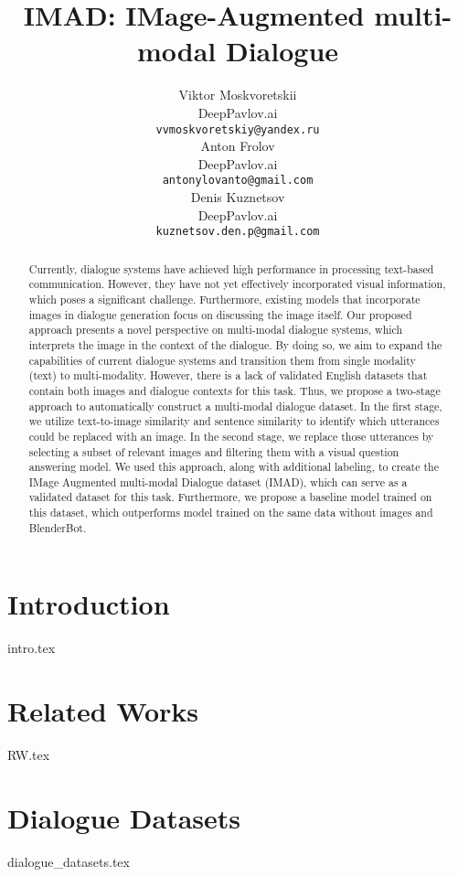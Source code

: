\documentclass{article}
\title{IMAD: IMage-Augmented multi-modal Dialogue
}
\author{
  Viktor Moskvoretskii \\
  DeepPavlov.ai \\
  \texttt{vvmoskvoretskiy@yandex.ru} \\
   \And
  Anton Frolov \\
  DeepPavlov.ai \\
  \texttt{antonylovanto@gmail.com} \\
  \And
  Denis Kuznetsov \\
  DeepPavlov.ai \\
  \texttt{kuznetsov.den.p@gmail.com} \\
}
\begin{document}
\maketitle


\begin{abstract}
  Currently, dialogue systems have achieved high performance in processing text-based communication. However, they have not yet effectively incorporated visual information, which poses a significant challenge. Furthermore, existing models that incorporate images in dialogue generation focus on discussing the image itself. Our proposed approach presents a novel perspective on multi-modal dialogue systems, which interprets the image in the context of the dialogue. By doing so, we aim to expand the capabilities of current dialogue systems and transition them from single modality (text) to multi-modality. However, there is a lack of validated English datasets that contain both images and dialogue contexts for this task. Thus, we propose a two-stage approach to automatically construct a multi-modal dialogue dataset. In the first stage, we utilize text-to-image similarity and sentence similarity to identify which utterances could be replaced with an image. In the second stage, we replace those utterances by selecting a subset of relevant images and filtering them with a visual question answering model. We used this approach, along with additional labeling, to create the IMage Augmented multi-modal Dialogue dataset (IMAD), which can serve as a validated dataset for this task. Furthermore, we propose a baseline model trained on this dataset, which outperforms model trained on the same data without images and BlenderBot.
\end{abstract}




\section{Introduction}
{intro.tex}

\section{Related Works}
{RW.tex}

\section{Dialogue Datasets}
{dialogue_datasets.tex}
\end{document}

